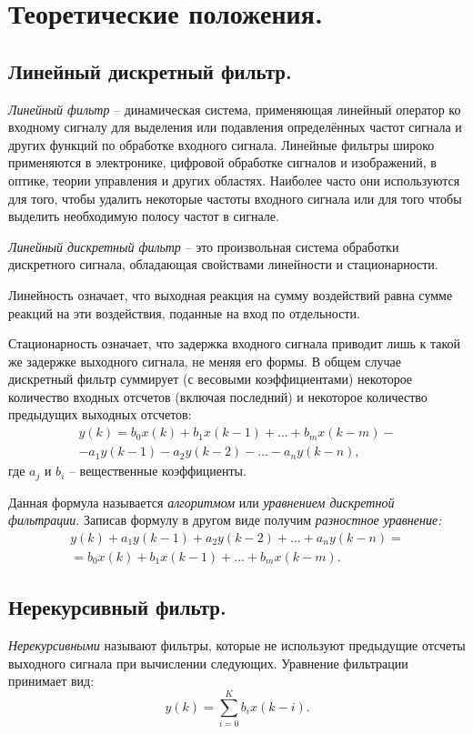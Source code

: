 \documentclass[a4paper,14pt]{extarticle}
\begin{document}
\section{Теоретические положения.}
\subsection{Линейный дискретный фильтр.}
\textit{Линейный фильтр} -- динамическая система, применяющая линейный оператор ко входному сигналу для выделения или подавления определённых частот сигнала и других функций по обработке входного сигнала. Линейные фильтры широко применяются в электронике, цифровой обработке сигналов и изображений, в оптике, теории управления и других областях.
Наиболее часто они используются для того, чтобы удалить некоторые частоты входного сигнала или для того чтобы выделить необходимую полосу частот в сигнале.

\textit{Линейный дискретный фильтр} – это произвольная система обработки дискретного сигнала, обладающая свойствами линейности и стационарности.

Линейность означает, что выходная реакция на сумму воздействий
равна сумме реакций на эти воздействия, поданные на вход по отдельности.

Стационарность означает, что задержка входного сигнала приводит
лишь к такой же задержке выходного сигнала, не меняя его формы.
В общем случае дискретный фильтр суммирует (с весовыми коэффициентами) некоторое количество входных отсчетов (включая последний) и
некоторое количество предыдущих выходных отсчетов:
\begin{multline*}
y(k) = b_0 x(k) + b_1 x(k-1) + ... + b_m x(k-m) - \\
- a_1 y(k-1) - a_2 y(k-2) - ... - a_n y(k-n), 
\end{multline*}
где $a_j$ и $b_i$ -- вещественные коэффициенты.

Данная формула называется \textit{алгоритмом} или \textit{уравнением дискретной фильтрации}. Записав формулу в другом виде получим \textit{разностное уравнение:}
\begin{multline*}
y(k) + a_1 y(k-1) + a_2 y(k-2) + ... + a_n y(k-n) = \\
= b_0 x(k) + b_1 x(k-1) + ... + b_m x(k-m).
\end{multline*}

\subsection{Нерекурсивный фильтр.}
\textit{Нерекурсивными} называют фильтры, которые не используют предыдущие отсчеты выходного сигнала при вычислении следующих. Уравнение фильтрации принимает вид:
\begin{equation*}
y(k) = \sum_{i=0}^K b_i x(k-i).
\end{equation*}
\end{document}
